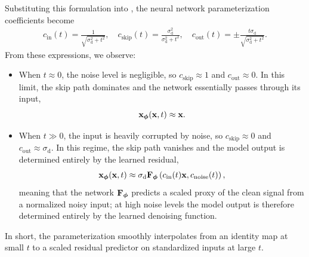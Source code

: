 Substituting this formulation into , the neural network parameterization coefficients become
\begin{align}\label{eq:edm-simple-coefficients}
    c_{\mathrm{in}}(t) = \frac{1}{\sqrt{\sigma_{\mathrm{d}}^2 + t^2}}, \quad
    c_{\mathrm{skip}}(t) = \frac{\sigma_{\mathrm{d}}^2}{\sigma_{\mathrm{d}}^2 + t^2}, \quad
    c_{\mathrm{out}}(t) = \pm \frac{t \sigma_{\mathrm{d}}}{\sqrt{\sigma_{\mathrm{d}}^2 + t^2}}.
\end{align}
From these expressions, we observe:
\begin{itemize}
    \item When $t \approx 0$, the noise level is negligible, so
    $c_{\mathrm{skip}} \approx 1$ and $c_{\mathrm{out}} \approx 0$. In this limit,
    the skip path dominates and the network essentially passes through its
    input,
    \[
    {\mathbf{x}}_{\bm{\phi}}({\mathbf{x}}, t) \approx {\mathbf{x}}.
    \]
    \item When $t \gg 0$, the input is heavily corrupted by noise, so
    $c_{\mathrm{skip}} \approx 0$ and $c_{\mathrm{out}} \approx \sigma_{\mathrm{d}}$.
    In this regime, the skip path vanishes and the model output is determined
    entirely by the learned residual,
    \[
    {\mathbf{x}}_{\bm{\phi}}({\mathbf{x}}, t) \approx \sigma_{\mathrm{d}} {\mathbf{F}}_{\bm{\phi}}\left(c_{\mathrm{in}}(t){\mathbf{x}}, c_{\mathrm{noise}}(t)\right),
    \]
    meaning that the network ${\mathbf{F}}_{\bm{\phi}}$ predicts a scaled proxy of the clean
signal from a normalized noisy input; at high noise levels the model output is
therefore determined entirely by the learned denoising function.
\end{itemize}
In short, the parameterization smoothly interpolates from an identity map at small $t$
to a scaled residual predictor on standardized inputs at large $t$.